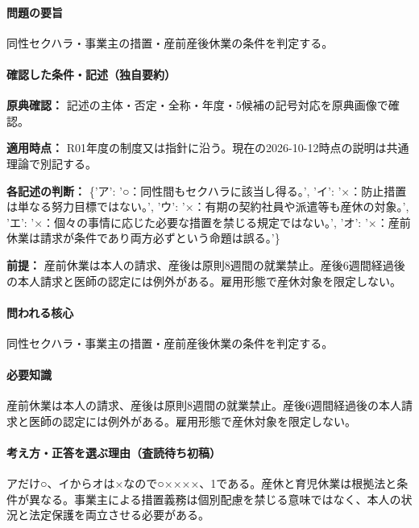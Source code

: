 \paragraph{問題の要旨} 同性セクハラ・事業主の措置・産前産後休業の条件を判定する。

\paragraph{確認した条件・記述（独自要約）}\mbox{}\par

\noindent\textbf{原典確認：} 記述の主体・否定・全称・年度・5候補の記号対応を原典画像で確認。\par

\noindent\textbf{適用時点：} R01年度の制度又は指針に沿う。現在の2026-10-12時点の説明は共通理論で別記する。\par

\noindent\textbf{各記述の判断：} \{'ア': '○：同性間もセクハラに該当し得る。', 'イ': '×：防止措置は単なる努力目標ではない。', 'ウ': '×：有期の契約社員や派遣等も産休の対象。', 'エ': '×：個々の事情に応じた必要な措置を禁じる規定ではない。', 'オ': '×：産前休業は請求が条件であり両方必ずという命題は誤る。'\}\par

\noindent\textbf{前提：} 産前休業は本人の請求、産後は原則8週間の就業禁止。産後6週間経過後の本人請求と医師の認定には例外がある。雇用形態で産休対象を限定しない。\par

\paragraph{問われる核心} 同性セクハラ・事業主の措置・産前産後休業の条件を判定する。

\paragraph{必要知識} 産前休業は本人の請求、産後は原則8週間の就業禁止。産後6週間経過後の本人請求と医師の認定には例外がある。雇用形態で産休対象を限定しない。

\paragraph{考え方・正答を選ぶ理由（査読待ち初稿）} アだけ○、イからオは×なので○××××、1である。産休と育児休業は根拠法と条件が異なる。事業主による措置義務は個別配慮を禁じる意味ではなく、本人の状況と法定保護を両立させる必要がある。

